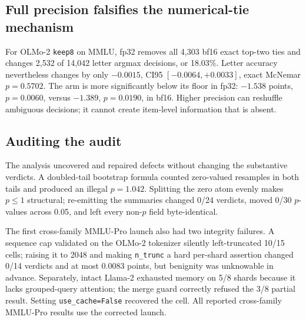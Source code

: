 

\subsection{Full precision falsifies the numerical-tie mechanism}

For OLMo-2 \texttt{keep8} on MMLU, fp32 removes all 4,303 bf16 exact top-two ties and changes 2,532 of 14,042 letter argmax decisions, or 18.03\%. Letter accuracy nevertheless changes by only $-0.0015$, CI95 $[-0.0064,+0.0033]$, exact McNemar $p=0.5702$. The arm is more significantly below its floor in fp32: $-1.538$ points, $p=0.0060$, versus $-1.389$, $p=0.0190$, in bf16. Higher precision can reshuffle ambiguous decisions; it cannot create item-level information that is absent.

\subsection{Auditing the audit}

The analysis uncovered and repaired defects without changing the substantive verdicts. A doubled-tail bootstrap formula counted zero-valued resamples in both tails and produced an illegal $p=1.042$. Splitting the zero atom evenly makes $p\leq1$ structural; re-emitting the summaries changed 0/24 verdicts, moved 0/30 $p$-values across 0.05, and left every non-$p$ field byte-identical.

The first cross-family MMLU-Pro launch also had two integrity failures. A sequence cap validated on the OLMo-2 tokenizer silently left-truncated 10/15 cells; raising it to 2048 and making \texttt{n\_trunc} a hard per-shard assertion changed 0/14 verdicts and at most 0.0083 points, but benignity was unknowable in advance. Separately, intact Llama-2 exhausted memory on 5/8 shards because it lacks grouped-query attention; the merge guard correctly refused the 3/8 partial result. Setting \texttt{use\_cache=False} recovered the cell. All reported cross-family MMLU-Pro results use the corrected launch.

